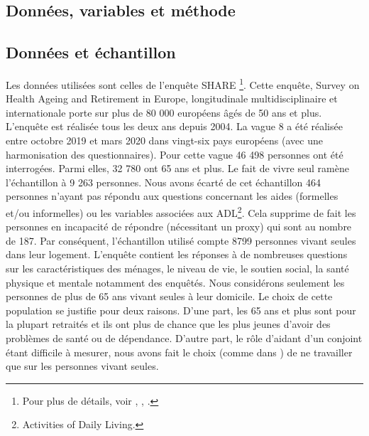 \begin{Article}
\begin{refsection}[Bonnal]



\section{Données, variables et méthode}

\subsection{Données et échantillon}

Les données utilisées sont celles de l'enquête SHARE \footnote{Pour plus de détails, voir \textcite{SHARE8}, \textcite{BORSCHSUPAN2013}, \textcite{BERGMANN2021}.}. Cette enquête, Survey on Health Ageing and Retirement in Europe, longitudinale multidisciplinaire et internationale porte sur plus de 80 000 européens âgés de 50 ans et plus. L’enquête est réalisée tous les deux ans depuis 2004. La vague 8 a été réalisée entre octobre 2019 et mars 2020 dans vingt-six pays européens (avec une harmonisation des questionnaires). Pour cette vague 46 498 personnes ont été interrogées. Parmi elles, 32 780 ont 65 ans et plus. Le fait de vivre seul ramène l’échantillon à 9 263 personnes. Nous avons écarté de cet échantillon 464 personnes n’ayant pas répondu aux questions concernant les aides (formelles et/ou informelles) ou les variables associées aux ADL\footnote{Activities of Daily Living.}. Cela supprime de fait les personnes en incapacité de répondre (nécessitant un proxy) qui sont au nombre de 187. Par conséquent, l’échantillon utilisé compte 8799 personnes vivant seules dans leur logement. L’enquête contient les réponses à de nombreuses questions sur les caractéristiques des ménages, le niveau de vie, le soutien social, la santé physique et mentale notamment des enquêtés. Nous considérons seulement les personnes de plus de 65 ans vivant seules à leur domicile. Le choix de cette population se justifie pour deux raisons. D'une part, les 65 ans et plus sont pour la plupart retraités et ils ont plus de chance que les plus jeunes d'avoir des problèmes de santé ou de dépendance. D'autre part, le rôle d'aidant d'un conjoint étant difficile à mesurer, nous avons fait le choix (comme dans \textcite{BALIA2014}) de ne travailler que sur les personnes vivant seules.


\end{refsection}
\end{Article}
